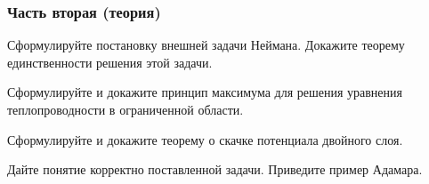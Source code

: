 \documentclass[a4paper]{article}
\begin{document}
\medskip

\subsubsection{Часть вторая (теория)}

\medskip
\setcounter{problem}{0}
\begin{problem}[3 балла]
Сформулируйте постановку внешней задачи Неймана. Докажите теорему единственности решения этой задачи.
\end{problem}

\begin{problem}[3 балла]
Сформулируйте и докажите принцип максимума для решения уравнения теплопроводности в ограниченной области.
\end{problem}

\begin{problem}[3 балла]
Сформулируйте и докажите теорему о скачке потенциала двойного слоя.
\end{problem}
\begin{problem}[2 балла]
Дайте понятие корректно поставленной задачи. Приведите пример Адамара.
\end{problem}

\medskip\dmvntrail
\end{document}
